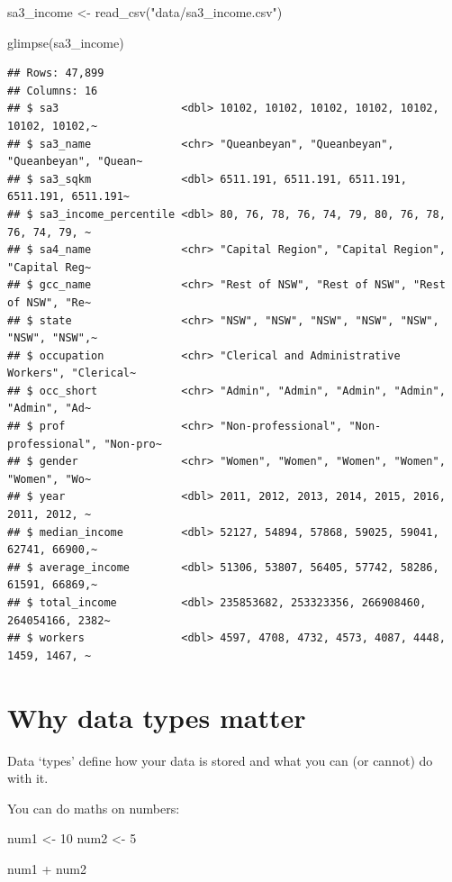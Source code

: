 \documentclass[
]{book}
\newenvironment{Shaded}{\begin{snugshade}}{\end{snugshade}}
\newcommand{\DecValTok}[1]{\textcolor[rgb]{0.00,0.00,0.81}{#1}}
\newcommand{\FunctionTok}[1]{\textcolor[rgb]{0.00,0.00,0.00}{#1}}
\newcommand{\NormalTok}[1]{#1}
\newcommand{\OtherTok}[1]{\textcolor[rgb]{0.56,0.35,0.01}{#1}}
\newcommand{\SpecialCharTok}[1]{\textcolor[rgb]{0.00,0.00,0.00}{#1}}
\newcommand{\StringTok}[1]{\textcolor[rgb]{0.31,0.60,0.02}{#1}}
\begin{document}
\begin{Shaded}
\begin{Highlighting}[]
\NormalTok{sa3\_income }\OtherTok{\textless{}{-}} \FunctionTok{read\_csv}\NormalTok{(}\StringTok{"data/sa3\_income.csv"}\NormalTok{)}

\FunctionTok{glimpse}\NormalTok{(sa3\_income)}
\end{Highlighting}
\end{Shaded}

\begin{verbatim}
## Rows: 47,899
## Columns: 16
## $ sa3                   <dbl> 10102, 10102, 10102, 10102, 10102, 10102, 10102,~
## $ sa3_name              <chr> "Queanbeyan", "Queanbeyan", "Queanbeyan", "Quean~
## $ sa3_sqkm              <dbl> 6511.191, 6511.191, 6511.191, 6511.191, 6511.191~
## $ sa3_income_percentile <dbl> 80, 76, 78, 76, 74, 79, 80, 76, 78, 76, 74, 79, ~
## $ sa4_name              <chr> "Capital Region", "Capital Region", "Capital Reg~
## $ gcc_name              <chr> "Rest of NSW", "Rest of NSW", "Rest of NSW", "Re~
## $ state                 <chr> "NSW", "NSW", "NSW", "NSW", "NSW", "NSW", "NSW",~
## $ occupation            <chr> "Clerical and Administrative Workers", "Clerical~
## $ occ_short             <chr> "Admin", "Admin", "Admin", "Admin", "Admin", "Ad~
## $ prof                  <chr> "Non-professional", "Non-professional", "Non-pro~
## $ gender                <chr> "Women", "Women", "Women", "Women", "Women", "Wo~
## $ year                  <dbl> 2011, 2012, 2013, 2014, 2015, 2016, 2011, 2012, ~
## $ median_income         <dbl> 52127, 54894, 57868, 59025, 59041, 62741, 66900,~
## $ average_income        <dbl> 51306, 53807, 56405, 57742, 58286, 61591, 66869,~
## $ total_income          <dbl> 235853682, 253323356, 266908460, 264054166, 2382~
## $ workers               <dbl> 4597, 4708, 4732, 4573, 4087, 4448, 1459, 1467, ~
\end{verbatim}

\hypertarget{why-data-types-matter}{%
\section{Why data types matter}\label{why-data-types-matter}}

Data `types' define how your data is stored and what you can (or cannot) do with it.

You can do maths on numbers:

\begin{Shaded}
\begin{Highlighting}[]
\NormalTok{num1 }\OtherTok{\textless{}{-}} \DecValTok{10}
\NormalTok{num2 }\OtherTok{\textless{}{-}} \DecValTok{5}

\NormalTok{num1 }\SpecialCharTok{+}\NormalTok{ num2}
\end{Highlighting}
\end{Shaded}
\end{document}
